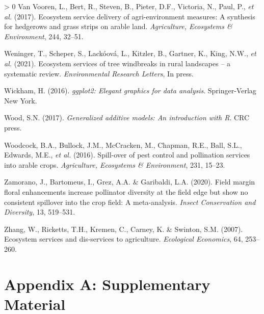 \documentclass[]{elsarticle} %
\newlength{\cslhangindent}
\newenvironment{CSLReferences}[3] %
 {%
  \setlength{\parindent}{0pt}
  \ifodd #1 \everypar{\setlength{\hangindent}{\cslhangindent}}\ignorespaces\fi
  \ifnum #2 > 0
  \setlength{\parskip}{#2\baselineskip}
  \fi
 }%
 {}
\begin{document}
\begin{CSLReferences}{1}{0}
\leavevmode\hypertarget{ref-vanVooren2017}{}%
Van Vooren, L., Bert, R., Steven, B., Pieter, D.F., Victoria, N., Paul, P., \emph{et al.} (2017). Ecosystem service delivery of agri-environment measures: A synthesis for hedgerows and grass strips on arable land. \emph{Agriculture, Ecosystems {\&} Environment}, 244, 32--51.

\leavevmode\hypertarget{ref-weninger2021}{}%
Weninger, T., Scheper, S., Lackóová, L., Kitzler, B., Gartner, K., King, N.W., \emph{et al.} (2021). Ecosystem services of tree windbreaks in rural landscapes -- a systematic review. \emph{Environmental Research Letters}, In press.

\leavevmode\hypertarget{ref-wickham2016}{}%
Wickham, H. (2016). \emph{{ggplot2}: Elegant graphics for data analysis}. Springer-Verlag New York.

\leavevmode\hypertarget{ref-wood2017}{}%
Wood, S.N. (2017). \emph{Generalized additive models: An introduction with {R}}. CRC press.

\leavevmode\hypertarget{ref-woodcock2016}{}%
Woodcock, B.A., Bullock, J.M., McCracken, M., Chapman, R.E., Ball, S.L., Edwards, M.E., \emph{et al.} (2016). Spill-over of pest control and pollination services into arable crops. \emph{Agriculture, Ecosystems \& Environment}, 231, 15--23.

\leavevmode\hypertarget{ref-zamorano2020}{}%
Zamorano, J., Bartomeus, I., Grez, A.A. \& Garibaldi, L.A. (2020). Field margin floral enhancements increase pollinator diversity at the field edge but show no consistent spillover into the crop field: A meta-analysis. \emph{Insect Conservation and Diversity}, 13, 519--531.

\leavevmode\hypertarget{ref-zhang2007}{}%
Zhang, W., Ricketts, T.H., Kremen, C., Carney, K. \& Swinton, S.M. (2007). Ecosystem services and dis-services to agriculture. \emph{Ecological Economics}, 64, 253--260.

\end{CSLReferences}

\newpage

\hypertarget{appendix-a-supplementary-material}{%
\section*{Appendix A: Supplementary Material}\label{appendix-a-supplementary-material}}
\end{document}
